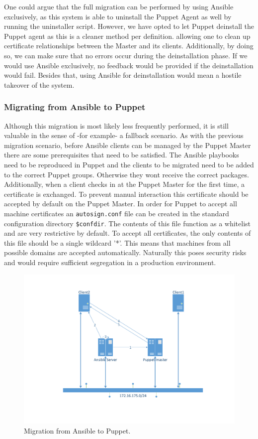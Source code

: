\noindent
One could argue that the full migration can be performed by using Ansible exclusively, as this system is able to uninstall the Puppet Agent as well by running the uninstaller script. However, we have opted to let Puppet deinstall the Puppet agent as this is a cleaner method per definition. allowing one to clean up certificate relationships between the Master and its clients. Additionally, by doing so, we can make sure that no errors occur during the deinstallation phase. If we would use Ansible exclusively, no feedback would be provided if the deinstallation would fail. Besides that, using Ansible for deinstallation would mean a hostile takeover of the system. 

\subsubsection{Migrating from Ansible to Puppet}\label{subsec:ansibletoPuppet}
Although this migration is most likely less frequently performed, it is still valuable in the sense of -for example- a fallback scenario. As with the previous migration scenario, before Ansible clients can be managed by the Puppet Master there are some prerequisites that need to be satisfied. The Ansible playbooks need to be reproduced in Puppet and the clients to be migrated need to be added to the correct Puppet groups. Otherwise they wont receive the correct packages. Additionally, when a client checks in at the Puppet Master for the first time, a certificate is exchanged. To prevent manual interaction this certificate should be accepted by default on the Puppet Master. In order for Puppet to accept all machine certificates an \texttt{autosign.conf} file can be created in the standard configuration directory \texttt{\$confdir}. The contents of this file function as a whitelist and are very restrictive by default. To accept all certificates, the only contents of this file should be a single wildcard '*'. This means that machines from all possible domains are accepted automatically. Naturally this poses security risks and would require sufficient segregation in a production environment.

\begin{figure}[!h]
        \includegraphics[scale=0.5]{img/AnsibletoPuppet.pdf}
        \caption{Migration from Ansible to Puppet.}
        \label{fig:situation2}
\end{figure}

